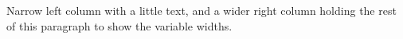 \documentclass{article}
\begin{document}
\begin{vwcol}[widths={0.3,0.7},sep=0.1,justify=raggedright]
Narrow left column with a little text, and a wider right column
holding the rest of this paragraph to show the variable widths.
\end{vwcol}
\end{document}
